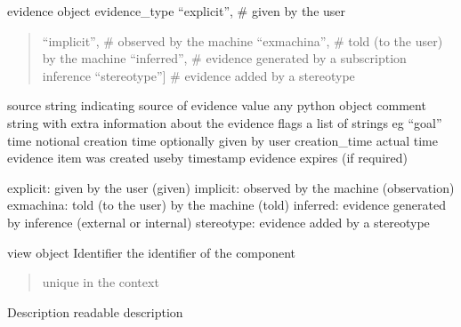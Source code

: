 \documentclass[letterpaper,10pt,english]{sphinxmanual}
\begin{document}
\begin{fulllineitems}
\label{personis.client:personis.client.Evidence}
evidence object
evidence\_type   ``explicit'', \# given by the user
\begin{quote}

``implicit'', \# observed by the machine
``exmachina'', \# told (to the user) by the machine
``inferred'', \# evidence generated by a subscription inference 
``stereotype''{]} \# evidence added by a stereotype
\end{quote}

source  string indicating source of evidence
value   any python object
comment string with extra information about the evidence
flags   a list of strings eg ``goal''
time    notional creation time optionally given by user
creation\_time actual time evidence item was created
useby   timestamp evidence expires (if required)

\begin{fulllineitems}
\label{personis.client:personis.client.Evidence.EvidenceTypes}
explicit: given by the user  (given)
implicit: observed by the machine (observation)
exmachina: told (to the user) by the machine (told)
inferred: evidence generated by inference (external or internal)
stereotype: evidence added by a stereotype

\end{fulllineitems}


\end{fulllineitems}


\begin{fulllineitems}
\label{personis.client:personis.client.View}
view object
Identifier  the identifier of the component
\begin{quote}

unique in the context
\end{quote}

Description readable description

\end{fulllineitems}
\end{document}
